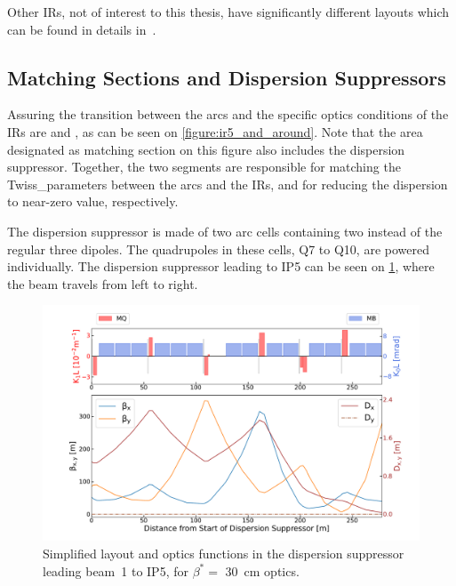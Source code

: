 Other IRs, not of interest to this thesis, have significantly different layouts which can be found in details in~\cite{BOOK:Bruning:LHC_Design_Report_Main_Ring,PHD:Vanbavinckhove}.

\subsection{Matching Sections and Dispersion Suppressors}
\label{subsection:matching_sections_dispersion_suppressors}

Assuring the transition between the arcs and the specific \gls{optics} conditions of the IRs are  and , as can be seen on \cref{figure:ir5_and_around}.
Note that the area designated as matching section on this figure also includes the dispersion suppressor.
Together, the two segments are responsible for matching the \gls{Twiss_parameters} between the arcs and the IRs, and for reducing the dispersion to near-zero value, respectively.

The dispersion suppressor is made of two arc cells containing two instead of the regular three dipoles.
The quadrupoles in these cells, Q\num{7} to Q\num{10}, are powered individually.
The dispersion suppressor leading to IP\num{5} can be seen on \cref{figure:lhc_dispersion_suppressor}, where the beam travels from left to right.

\begin{figure}[!hbt]
  \centering
  \includegraphics*[width=0.99\linewidth]{Figures/Optics_Measurements_Corrections_at_LHC/lhc_dispersion_suppressor.pdf}
  \caption{Simplified layout and optics functions in the dispersion suppressor leading beam~\num{1} to IP\num{5}, for \(\beta^{\ast} =\) \qty{30}{\centi\meter} optics.}
  \label{figure:lhc_dispersion_suppressor}
\end{figure}

